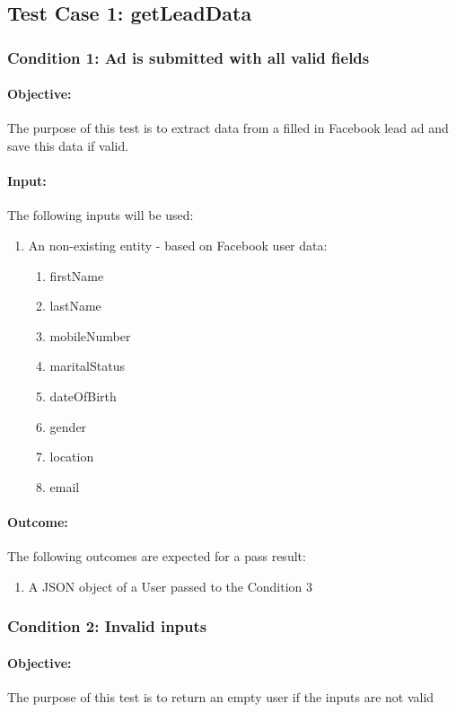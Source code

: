 \documentclass{article}
\begin{document}
\subsection{Test Case 1: getLeadData}\label{test1}
\subsubsection{Condition 1: Ad is submitted with all valid fields }
\paragraph{Objective:} The purpose of this test is to extract data from a filled in Facebook lead ad and save this data if valid.
\paragraph{Input:} The following inputs will be used:
\begin{enumerate}
	\item An non-existing entity - based on Facebook user data:
	\begin{enumerate}
		\item firstName
  		\item lastName
  		\item mobileNumber 
  		\item maritalStatus 
  		\item dateOfBirth 
 		\item gender
  		\item location 
 		\item email	
	\end{enumerate}
\end{enumerate}
\paragraph{Outcome:} The following outcomes are expected for a pass result:
\begin{enumerate}
	\item A JSON object of a User passed to the Condition 3
\end{enumerate}
\subsubsection{Condition 2: Invalid inputs}
\paragraph{Objective:} The purpose of this test is to return an empty user if the inputs are not valid
\end{document}
